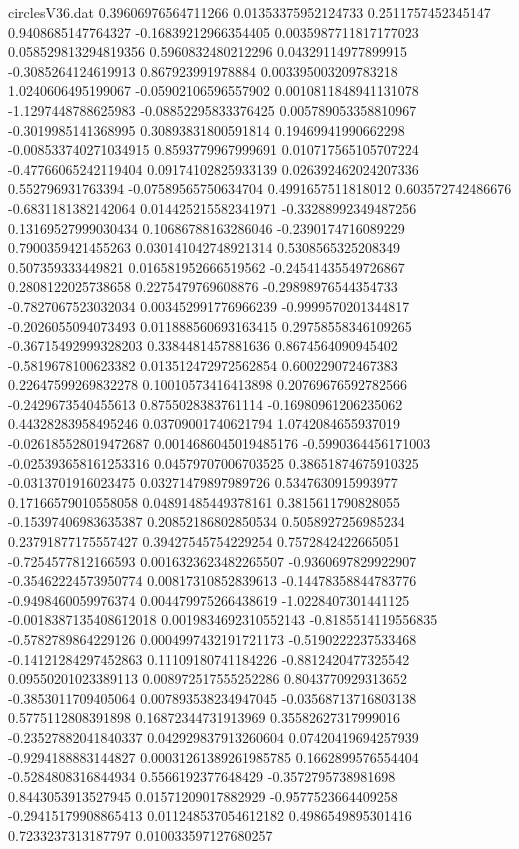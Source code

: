 \begin{filecontents}{circlesV36.dat}
0.39606976564711266	0.01353375952124733	0.2511757452345147
0.9408685147764327	-0.16839212966354405	0.0035987711817177023
0.058529813294819356	0.5960832480212296	0.04329114977899915
-0.3085264124619913	0.867923991978884	0.003395003209783218
1.0240606495199067	-0.05902106596557902	0.0010811848941131078
-1.1297448788625983	-0.08852295833376425	0.005789053358810967
-0.3019985141368995	0.30893831800591814	0.19469941990662298
-0.008533740271034915	0.8593779967999691	0.010717565105707224
-0.47766065242119404	0.09174102825933139	0.026392462024207336
0.552796931763394	-0.07589565750634704	0.4991657511818012
0.603572742486676	-0.6831181382142064	0.014425215582341971
-0.33288992349487256	0.13169527999030434	0.10686788163286046
-0.2390174716089229	0.7900359421455263	0.030141042748921314
0.5308565325208349	0.507359333449821	0.016581952666519562
-0.24541435549726867	0.2808122025738658	0.2275479769608876
-0.29898976544354733	-0.7827067523032034	0.003452991776966239
-0.9999570201344817	-0.2026055094073493	0.011888560693163415
0.29758558346109265	-0.36715492999328203	0.3384481457881636
0.8674564090945402	-0.5819678100623382	0.013512472972562854
0.600229072467383	0.22647599269832278	0.10010573416413898
0.20769676592782566	-0.2429673540455613	0.8755028383761114
-0.16980961206235062	0.44328283958495246	0.03709001740621794
1.0742084655937019	-0.026185528019472687	0.0014686045019485176
-0.5990364456171003	-0.025393658161253316	0.04579707006703525
0.38651874675910325	-0.0313701916023475	0.03271479897989726
0.5347630915993977	0.17166579010558058	0.04891485449378161
0.3815611790828055	-0.15397406983635387	0.20852186802850534
0.5058927256985234	0.23791877175557427	0.39427545754229254
0.7572842422665051	-0.7254577812166593	0.0016323623482265507
-0.9360697829922907	-0.35462224573950774	0.00817310852839613
-0.14478358844783776	-0.9498460059976374	0.004479975266438619
-1.0228407301441125	-0.0018387135408612018	0.0019834692310552143
-0.8185514119556835	-0.5782789864229126	0.0004997432191721173
-0.5190222237533468	-0.14121284297452863	0.11109180741184226
-0.8812420477325542	0.09550201023389113	0.008972517555252286
0.8043770929313652	-0.3853011709405064	0.007893538234947045
-0.03568713716803138	0.5775112808391898	0.16872344731913969
0.35582627317999016	-0.23527882041840337	0.042929837913260604
0.07420419694257939	-0.9294188883144827	0.00031261389261985785
0.1662899576554404	-0.5284808316844934	0.5566192377648429
-0.3572795738981698	0.8443053913527945	0.01571209017882929
-0.9577523664409258	-0.29415179908865413	0.011248537054612182
0.4986549895301416	0.7233237313187797	0.010033597127680257

\end{filecontents}
